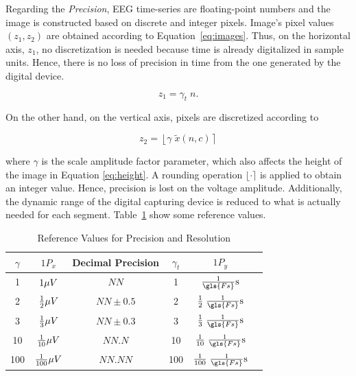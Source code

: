 Regarding the \textit{Precision}, EEG time-series are floating-point numbers and the image is constructed based on discrete and integer pixels.  Image's pixel values $(z_1,z_2)$ are obtained according to Equation~\ref{eq:images}.  Thus, on the horizontal axis, $z_1$, no discretization is needed because time is already digitalized in sample units. Hence, there is no loss of precision in time from the one generated by the digital device.

\begin{equation}
z_1 = \gamma_t  \; n.
\label{eq:horizontalpixelation}
\end{equation}

On the other hand, on the vertical axis, pixels are discretized according to

\begin{equation}
z_2 = \left \lfloor{ \gamma  \; \tilde{x}(n,c)  }\right \rceil
\label{eq:verticalpixelation}
\end{equation}

\noindent where $\gamma$ is the scale amplitude factor parameter, which also affects the height of the image in Equation \ref{eq:height}. A rounding operation $\lfloor  \cdot \rceil$ is applied to obtain an integer value.  Hence, precision is lost on the voltage amplitude. Additionally, the dynamic range of the digital capturing device is reduced to what is actually needed for each segment.  Table~\ref{tab:precision} show some reference values.

\begin{table}[htb]
\caption[Reference Values for Precision and Resolution]{Reference Values for Precision and Resolution}
\centering
\begin{tabular}{c|c|c||c|c|c}
\toprule
\textbf{$\gamma$}	&  $1 P_x$ 	&  Decimal Precision & \textbf{$\gamma_t$}	&  $1 P_y$  \\
\midrule
1     &     $1 \si\mu{V}$   &  $NN$                               & 1    &     $\frac{1}{\gls{Fs}} \si{s}$    \\
2    &     $\frac{1}{2} \si\mu{V}$   &  $NN \pm 0.5$  & 2    &     $\frac{1}{2} \; \frac{1}{\gls{Fs}} \si{s}$    \\
3     &     $\frac{1}{3} \si\mu{V}$   &  $NN\pm 0.3$  & 3    &     $\frac{1}{3} \;  \frac{1}{\gls{Fs}} \si{s}$    \\
10     &     $\frac{1}{10} \si\mu{V}$   &  $NN.N$        & 10   &     $\frac{1}{10} \; \frac{1}{\gls{Fs}} \si{s}$    \\
100     &     $\frac{1}{100} \si\mu{V}$   &  $NN.NN$ & 100 &     $\frac{1}{100} \; \frac{1}{\gls{Fs}} \si{s}$    \\
\bottomrule
\end{tabular}
\label{tab:precision}
\end{table}
